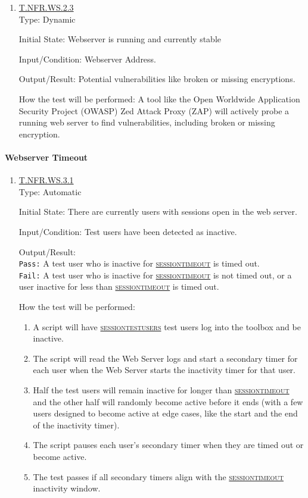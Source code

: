 \documentclass[12pt, titlepage]{article}
\newcommand{\testdef}[1]{\leavevmode\hypertarget{test:#1}{}\hyperlink{trace:#1}{#1}}
\DeclareRobustCommand{\cname}[1]{{\renewcommand{\_}{\textunderscore\allowbreak}\textsc{#1}}}
\newcommand{\constfirst}[1]{\leavevmode\hypertarget{constfirst:\detokenize{#1}}{}\hyperlink{const:\detokenize{#1}}{\cname{#1}}}
\newcommand{\const}[1]{\hyperlink{const:\detokenize{#1}}{\cname{#1}}}
\begin{document}
\begin{enumerate}
\item \testdef{T.NFR.WS.2.3}\\
Type: Dynamic

Initial State: Webserver is running and currently stable

Input/Condition: Webserver Address.

Output/Result: Potential vulnerabilities like broken or missing encryptions.

How the test will be performed: A tool like the Open Worldwide Application Security Project (OWASP) Zed Attack Proxy (ZAP) will actively probe a running web server to find vulnerabilities, including broken or missing encryption.
\end{enumerate}


\paragraph{Webserver Timeout}
\begin{enumerate}
  \item \testdef{T.NFR.WS.3.1}\\
  Type: Automatic

  Initial State: There are currently users with sessions open in the web server.

  Input/Condition: Test users have been detected as inactive.

  Output/Result: \\
  \texttt{Pass:} A test user who is inactive for \constfirst{session\_timeout} is timed out.\\
  \texttt{Fail:} A test user who is inactive for \const{session\_timeout} is not timed out, or a user inactive for less than \const{session\_timeout} is timed out.

  How the test will be performed:
  \begin{enumerate}
    \item A script will have \constfirst{session\_test\_users} test users log into the toolbox and be inactive.
    \item The script will read the Web Server logs and start a secondary timer for each user when the Web Server starts the inactivity timer for that user.
    \item Half the test users will remain inactive for longer than \const{session\_timeout} and the other half will randomly become active before it ends (with a few users designed to become active at edge cases, like the start and the end of the inactivity timer).
    \item The script pauses each user's secondary timer when they are timed out or become active.
    \item The test passes if all secondary timers align with the \const{session\_timeout} inactivity window.
  \end{enumerate}
\end{enumerate}
\end{document}
